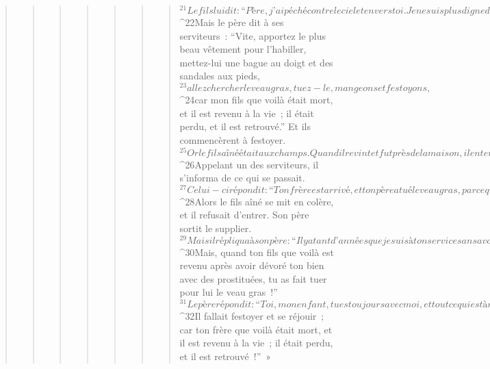 \begin{verse}
\begin{verse}
\begin{verse}
\begin{verse}
\begin{verse}
\begin{verse}
\begin{verse}
${}^{21}Le fils lui dit : “Père, j’ai péché contre le ciel et envers toi. Je ne suis plus digne d’être appelé ton fils.” 
${}^{22}Mais le père dit à ses serviteurs : “Vite, apportez le plus beau vêtement pour l’habiller, mettez-lui une bague au doigt et des sandales aux pieds, 
${}^{23}allez chercher le veau gras, tuez-le, mangeons et festoyons, 
${}^{24}car mon fils que voilà était mort, et il est revenu à la vie ; il était perdu, et il est retrouvé.” Et ils commencèrent à festoyer. 
${}^{25}Or le fils aîné était aux champs. Quand il revint et fut près de la maison, il entendit la musique et les danses. 
${}^{26}Appelant un des serviteurs, il s’informa de ce qui se passait. 
${}^{27}Celui-ci répondit : “Ton frère est arrivé, et ton père a tué le veau gras, parce qu’il a retrouvé ton frère en bonne santé.” 
${}^{28}Alors le fils aîné se mit en colère, et il refusait d’entrer. Son père sortit le supplier. 
${}^{29}Mais il répliqua à son père : “Il y a tant d’années que je suis à ton service sans avoir jamais transgressé tes ordres, et jamais tu ne m’as donné un chevreau pour festoyer avec mes amis. 
${}^{30}Mais, quand ton fils que voilà est revenu après avoir dévoré ton bien avec des prostituées, tu as fait tuer pour lui le veau gras !” 
${}^{31}Le père répondit : “Toi, mon enfant, tu es toujours avec moi, et tout ce qui est à moi est à toi. 
${}^{32}Il fallait festoyer et se réjouir ; car ton frère que voilà était mort, et il est revenu à la vie ; il était perdu, et il est retrouvé !” »
      

\end{verse}
\end{verse}
\end{verse}
\end{verse}
\end{verse}
\end{verse}
\end{verse}
